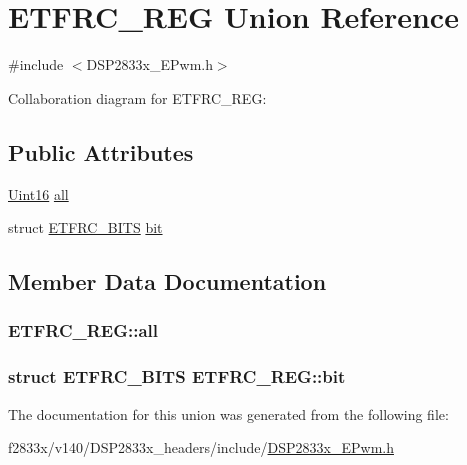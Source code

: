 \hypertarget{union_e_t_f_r_c___r_e_g}{}\section{E\+T\+F\+R\+C\+\_\+\+R\+E\+G Union Reference}
\label{union_e_t_f_r_c___r_e_g}


{\ttfamily \#include $<$D\+S\+P2833x\+\_\+\+E\+Pwm.\+h$>$}



Collaboration diagram for E\+T\+F\+R\+C\+\_\+\+R\+E\+G\+:
\subsection*{Public Attributes}
\begin{DoxyCompactItemize}
\item 
\hyperlink{_d_s_p2833x___device_8h_a59a9f6be4562c327cbfb4f7e8e18f08b}{Uint16} \hyperlink{union_e_t_f_r_c___r_e_g_aa71d9444f9be6372e734c9308e98c51f}{all}
\item 
struct \hyperlink{struct_e_t_f_r_c___b_i_t_s}{E\+T\+F\+R\+C\+\_\+\+B\+I\+T\+S} \hyperlink{union_e_t_f_r_c___r_e_g_aee9b186b3c90ad2a6d414e4cc6daedbd}{bit}
\end{DoxyCompactItemize}


\subsection{Member Data Documentation}
\hypertarget{union_e_t_f_r_c___r_e_g_aa71d9444f9be6372e734c9308e98c51f}{}
\subsubsection[{all}]{ E\+T\+F\+R\+C\+\_\+\+R\+E\+G\+::all}\label{union_e_t_f_r_c___r_e_g_aa71d9444f9be6372e734c9308e98c51f}
\hypertarget{union_e_t_f_r_c___r_e_g_aee9b186b3c90ad2a6d414e4cc6daedbd}{}
\subsubsection[{bit}]{\setlength{\rightskip}{0pt plus 5cm}struct {\bf E\+T\+F\+R\+C\+\_\+\+B\+I\+T\+S} E\+T\+F\+R\+C\+\_\+\+R\+E\+G\+::bit}\label{union_e_t_f_r_c___r_e_g_aee9b186b3c90ad2a6d414e4cc6daedbd}


The documentation for this union was generated from the following file\+:\begin{DoxyCompactItemize}
\item 
f2833x/v140/\+D\+S\+P2833x\+\_\+headers/include/\hyperlink{_d_s_p2833x___e_pwm_8h}{D\+S\+P2833x\+\_\+\+E\+Pwm.\+h}\end{DoxyCompactItemize}
